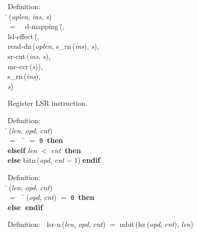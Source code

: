 \begin{tabbing}{\sc Definition}: \\  
\=\,({\it{oplen\/}}, {\it{ins\/}}, {\it{s\/}}) \\ 
$=$$\;\;\;\;${\rm{d-mapping}}\,(\=, \\ 
{\rm{lsl-effect}}\,(\=, \\ 
{\rm{read-dn}}\,({\it{oplen\/}}, {\rm{s\_rn}}\,({\it{ins\/}}), {\it{s\/}}), \\ 
{\rm{sr-cnt}}\,({\it{ins\/}}, {\it{s\/}}), \\ 
{\rm{mc-ccr}}\,({\it{s\/}}))\-, \\ 
{\rm{s\_rn}}\,({\it{ins\/}}), \\ 
{\it{s\/}})\-\-
\end{tabbing}

 Register LSR instruction.
\begin{tabbing}{\sc Definition}: \\  
\=\,({\it{len\/}}, {\it{opd\/}}, {\it{cnt\/}}) \\ 
$=$$\;\;\;\;$\= $=$ {\tt{0}}$\;\;${\bf then }{} \\ 
{\bf elseif }{\it{len\/}} $<$ {\it{cnt\/}}$\;\;${\bf then }{} \\ 
{\bf else }{\rm{bitn}}\,({\it{opd\/}}, {\it{cnt\/}} $-\;1$)$\;${\bf  endif}\-\-
\end{tabbing}

\begin{tabbing}{\sc Definition}: \\  
\=\,({\it{len\/}}, {\it{opd\/}}, {\it{cnt\/}}) \\ 
$=$$\;\;\;\;$\=\,({\it{opd\/}}, {\it{cnt\/}}) $=$ {\tt{0}}$\;\;${\bf then }{} \\ 
{\bf else }{}$\;${\bf  endif}\-\-
\end{tabbing}

\begin{tabbing}{\sc Definition}:$\;\;$
{\rm{lsr-n}}\,({\it{len\/}}, {\it{opd\/}}, {\it{cnt\/}}) $=$ {\rm{mbit}}\,({\rm{lsr}}\,({\it{opd\/}}, {\it{cnt\/}}), {\it{len\/}})
\end{tabbing}


